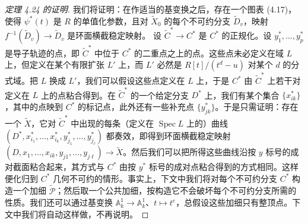 \begin{proof}[定理 4.24 的证明]
 我们将证明：在作适当的基变换之后，存在一个图表 (4.17)，使得 $\psi^*(t)$ 是 $R$ 的单值化参数，且对 $\widetilde X_0$ 的每个不可约分支 $\widetilde D_v$，映射 $f^{-1}(\widetilde D_v)\to\widetilde D_v$ 是环面横截稳定映射。
设 $\widetilde C^*\to C^*$ 是 $C^*$ 的正规化。设 $y^*_1,\dots,y^*_p$ 是导子轨迹的点，即 $\widetilde C^*$ 中位于 $C^*$ 的二重点之上的点。这些点未必定义在域 $L$ 上，但定义在某个有限扩张 $L'$ 上，而 $L'$ 必然是 $R[t]/(t^d-u)$ 对某个 $d$ 的分式域。把 $L$ 换成 $L'$，我们可以假设这些点定义在 $L$ 上，于是 $C^*$ 由 $\widetilde C^*$ 上若干对定义在 $L$ 上的点粘合得到。在 $\widetilde C^*$ 的一个给定分支 $D^*$ 上，我们有某个集合 $\{x^*_{ik}\}$，其中的点映到 $C^*$ 的标记点，此外还有一些补充点 $\{y^*_{jk}\}$。于是只需证明：存在一个 $\widetilde X$，它对 $\widetilde C^*$ 中出现的每条（定义在 $\operatorname{Spec}L$ 上的）曲线 $(D^*,x^*_{i_1},\dots,x^*_{i_k},y^*_{j_1},\dots,y^*_{j_\ell})$ 都奏效，即得到环面横截稳定映射 $(D,x_1,\dots,x_{ik},y_{j1},\dots,y_{j\ell})\to\widetilde X$。然后我们可以把所得这些曲线沿按 $y$ 标号的成对截面粘合起来，其方式与 $C^*$ 由按 $y^*$ 标号的成对点粘合得到的方式相同。这样便化归到 $C^*$ 几何不可约的情形。事实上，下文中我们将对每个不可约分支 $C^*$ 构造一个加细 $\widetilde{\mathcal P}$；然后取一个公共加细，按构造它不会破坏每个不可约分支所需的性质。我们还可以通过基变换 $\mathbb{A}^1_k\to\mathbb{A}^1_k$、$t\mapsto t^e$，总假设这些加细只有整顶点。下文中我们将自动这样做，不再说明。


\end{proof}
